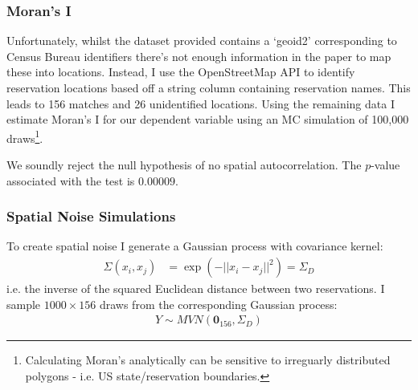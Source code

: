 \documentclass[12pt]{article}
\begin{document}

\subsubsection*{Moran's I}
Unfortunately, whilst the dataset provided contains a `geoid2' corresponding to Census Bureau identifiers there's not enough information in the paper to map these 
into locations. Instead, I use the OpenStreetMap API \citep{OpenStreetMap} to identify reservation locations based off a string column containing reservation names. This leads 
to 156 matches and  26 unidentified locations. Using the remaining data I estimate Moran's I for our dependent variable using an MC simulation of 100,000 draws\footnote{Calculating Moran's analytically can be sensitive to irreguarly distributed polygons - i.e. US state/reservation boundaries.}.

We soundly reject the null hypothesis of no spatial autocorrelation. The $p$-value associated with the test is $0.00009$.


\subsubsection*{Spatial Noise Simulations}

To create spatial noise I generate a Gaussian process with covariance kernel:
\begin{align*}
    \Sigma(x_i, x_j) &= \exp(- || x_i - x_j ||^2) 
    = \Sigma_D
\end{align*}
i.e. the inverse of the squared Euclidean distance between two reservations. I sample $1000 \times 156$ draws from the corresponding 
Gaussian process:
\begin{align*}
    Y \sim MVN(\mathbf{0}_{156}, \Sigma_D)
\end{align*}
\end{document}
